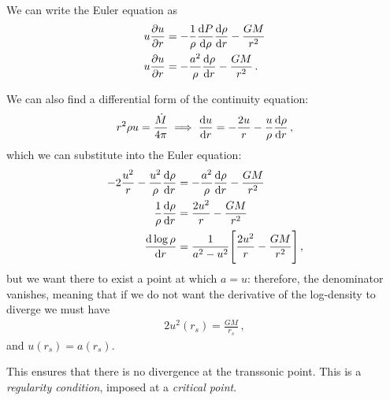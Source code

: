 \documentclass[main.tex]{subfiles}
\begin{document}
We can write the Euler equation as 
%
\begin{align}
u \pdv{u}{r} &= - \frac{1}{\rho } \dv{P}{\rho } \dv{\rho }{r} - \frac{GM}{r^2}   \\
u \pdv{u}{r} &= - \frac{a^2}{\rho } \dv{\rho }{r } - \frac{GM}{r^2}
\,.
\end{align}

We can also find a differential form of the continuity equation: 
%
\begin{align}
r^2 \rho u = \frac{\dot{M}}{4 \pi  } \implies
\dv{u}{r} = - \frac{2u}{r} - \frac{u}{\rho } \dv{\rho }{r}
\,,
\end{align}
%
which we can substitute into the Euler equation: 
%
\begin{align}
-2 \frac{u^2}{r} - \frac{u^2}{\rho } \dv{\rho }{r}
&= - \frac{a^2}{\rho } \dv{\rho }{r} - \frac{GM}{r^2}  \\
\frac{1}{\rho } \dv{\rho }{r} (a^2 - u^2) &= \frac{2u^2}{r} - \frac{GM}{r^2}  \\
\dv{\log \rho }{r} &= \frac{1}{a^2 - u^2} \qty[\frac{2u^2}{r} - \frac{GM}{r^2}]
\,,
\end{align}
%
but we want there to exist a point at which \(a = u\): therefore, the denominator vanishes, meaning that if we do not want the derivative of the log-density to diverge we must have 
%
\begin{align}
2 u^2 (r_s) = \frac{GM}{r_s}
\,,
\end{align}
%
and \(u (r_s) = a( r_s)\). 

This ensures that there is no divergence at the transsonic point. 
This is a \emph{regularity condition}, imposed at a \emph{critical point}.
\end{document}
